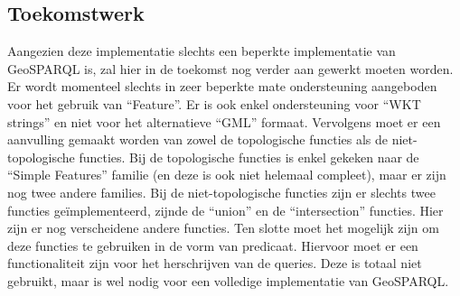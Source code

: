 \subsection{Toekomstwerk}
\label{subsec:toekomstwerk}
Aangezien deze implementatie slechts een beperkte implementatie van GeoSPARQL is, zal hier in de toekomst nog verder aan gewerkt moeten worden. Er wordt momenteel slechts in zeer beperkte mate ondersteuning aangeboden voor het gebruik van ``Feature''. Er is ook enkel ondersteuning voor ``WKT strings'' en niet voor het alternatieve ``GML'' formaat. Vervolgens moet er een aanvulling gemaakt worden van zowel de topologische functies als de niet-topologische functies. Bij de topologische functies is enkel gekeken naar de ``Simple Features'' familie (en deze is ook niet helemaal compleet), maar er zijn nog twee andere families. Bij de niet-topologische functies zijn er slechts twee functies geïmplementeerd, zijnde de ``union'' en de ``intersection'' functies. Hier zijn er nog verscheidene andere functies. Ten slotte moet het mogelijk zijn om deze functies te gebruiken in de vorm van predicaat. Hiervoor moet er een functionaliteit zijn voor het herschrijven van de queries. Deze is totaal niet gebruikt, maar is wel nodig voor een volledige implementatie van GeoSPARQL. 